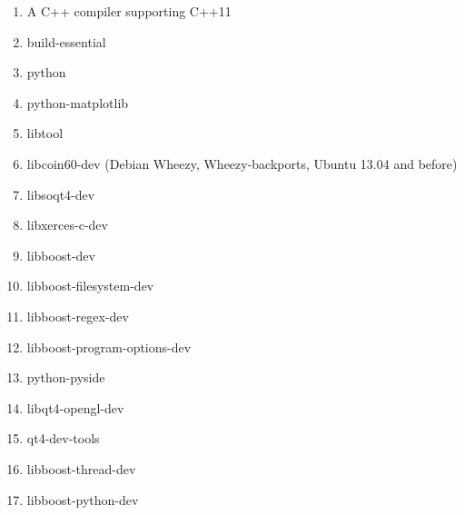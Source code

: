 \begin{enumerate} 
	\item A C++ compiler supporting C++11
	\item build-essential
	\item python
	\item python-matplotlib
	\item libtool
	\item libcoin60-dev (Debian Wheezy, Wheezy-backports, Ubuntu 13.04 and before)
	\item libsoqt4-dev
	\item libxerces-c-dev
	\item libboost-dev
	\item libboost-filesystem-dev
	\item libboost-regex-dev
	\item libboost-program-options-dev
	\item python-pyside
	\item libqt4-opengl-dev
	\item qt4-dev-tools
	\item libboost-thread-dev
	\item libboost-python-dev
\end{enumerate}
